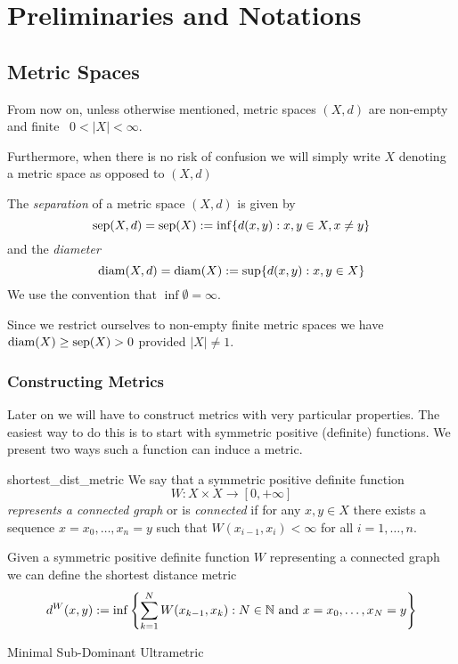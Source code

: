 \chapter{Preliminaries and Notations}

\section{Metric Spaces}
From now on, unless otherwise mentioned, \todo[is it ever?] metric spaces $(X,d)$ are non-empty and finite \ie\ $0 < |X| < \infty$.

Furthermore, when there is no risk of confusion we will simply write $X$ denoting a metric space as opposed to $(X,d)$

\begin{definition}{}{}
The \emph{separation} of a metric space $(X,d)$ is given by
\begin{equation*}
\mathrm{sep}(X,d) = \mathrm{sep}(X) := \inf\{d(x,y): x,y \in X, x \neq y\}
\end{equation*}
and the \emph{diameter}
\begin{equation*}
\mathrm{diam}(X,d) = \mathrm{diam}(X) := \sup\{d(x,y): x,y \in X\}
\end{equation*}
We use the convention that $\inf \emptyset = \infty$. 
\end{definition}

Since we restrict ourselves to non-empty finite metric spaces we have $\mathrm{diam}(X) \geq \mathrm{sep}(X) > 0$ provided $|X| \neq 1$.

\subsection{Constructing Metrics}
Later on we will have to construct metrics with very particular properties. The easiest way to do this is to start with symmetric positive (definite) functions. We present two ways such a function can induce a metric.

\begin{definition}{}{shortest_dist_metric}
We say that a symmetric positive definite function
$$
W: X \times X \to [0, +\infty]
$$
\emph{represents a connected graph} or is \emph{connected} if for any $x,y \in X$ there exists a sequence $x = x_0, \dots, x_n = y$ such that $W(x_{i-1}, x_{i}) < \infty$ for all $i = 1, \dots, n$.
\end{definition}

\begin{definition}{}{}
Given a symmetric positive definite function $W$ representing a connected graph we can define the shortest distance metric
\begin{equation*}
    d^W(x,y) := \inf\left\{ \sum_{k = 1}^N W(x_{k-1}, x_k): N \in \mathbb N \text{ and } x = x_0, \dots, x_N = y\right\}
\end{equation*}
\end{definition}



\begin{defprop}{}{}

Minimal Sub-Dominant Ultrametric
\end{defprop}
